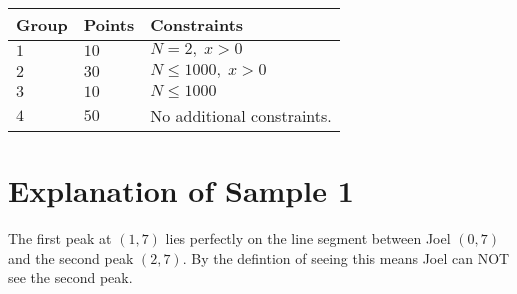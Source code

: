 \noindent
\begin{tabular}{| l | l | p{12cm} |}
  \hline
  \textbf{Group} & \textbf{Points} & \textbf{Constraints} \\ \hline
  $1$    & $10$       & $N = 2,\;x > 0$ \\ \hline
  $2$    & $30$       & $N \leq 1000,\;x > 0$ \\ \hline
  $3$    & $10$       & $N \leq 1000$ \\ \hline
  $4$    & $50$       & No additional constraints. \\ \hline
\end{tabular}

\section*{Explanation of Sample 1}
The first peak at $(1, 7)$ lies perfectly on the line segment between Joel $(0, 7)$ and the second peak $(2, 7)$. By the defintion of seeing this means Joel can NOT see the second peak.

